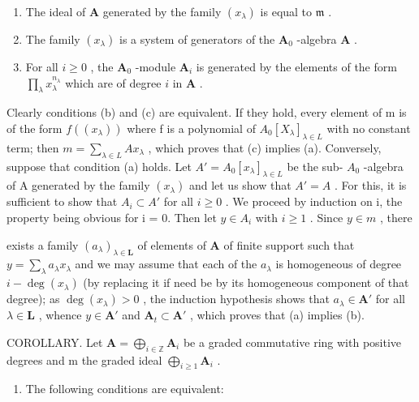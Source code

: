 \begin{enumerate}
\def\labelenumi{(\alph{enumi})}
\item
  The ideal of \(\mathbf{A}\) generated by the family \((x_{\lambda})\) is equal to \(\mathfrak{m}\) .
\item
  The family \((x_{\lambda})\) is a system of generators of the \(\mathbf{A}_0\) -algebra \(\mathbf{A}\) .
\item
  For all \(i \geqslant 0\) , the \(\mathbf{A}_0\) -module \(\mathbf{A}_i\) is generated by the elements of the form \(\prod_{\lambda} x_{\lambda}^{n_{\lambda}}\) which are of degree \(i\) in \(\mathbf{A}\) .
\end{enumerate}

Clearly conditions (b) and (c) are equivalent. If they hold, every element of m is of the form \(f((x_{\lambda}))\) where f is a polynomial of \(A_{0}[X_{\lambda}]_{\lambda \in L}\) with no constant term; then \(m = \sum_{\lambda \in L} Ax_{\lambda}\) , which proves that (c) implies (a). Conversely, suppose that condition (a) holds. Let \(A' = A_{0}[x_{\lambda}]_{\lambda \in L}\) be the sub- \(A_{0}\) -algebra of A generated by the family \((x_{\lambda})\) and let us show that \(A' = A\) . For this, it is sufficient to show that \(A_{i} \subset A'\) for all \(i \geqslant 0\) . We proceed by induction on i, the property being obvious for i = 0. Then let \(y \in A_{i}\) with \(i \geqslant 1\) . Since \(y \in m\) , there

exists a family \((a_{\lambda})_{\lambda \in \mathbf{L}}\) of elements of \(\mathbf{A}\) of finite support such that \(y = \sum_{\lambda} a_{\lambda} x_{\lambda}\) and we may assume that each of the \(a_{\lambda}\) is homogeneous of degree \(i - \deg(x_{\lambda})\) (by replacing it if need be by its homogeneous component of that degree); as \(\deg(x_{\lambda}) > 0\) , the induction hypothesis shows that \(a_{\lambda} \in \mathbf{A}'\) for all \(\lambda \in \mathbf{L}\) , whence \(y \in \mathbf{A}'\) and \(\mathbf{A}_t \subset \mathbf{A}'\) , which proves that (a) implies (b).

COROLLARY. Let \(\mathbf{A} = \bigoplus_{i\in \mathbb{Z}}\mathbf{A}_i\) be a graded commutative ring with positive degrees and m the graded ideal \(\bigoplus_{i\geqslant 1}\mathbf{A}_i\) .

\begin{enumerate}
\def\labelenumi{(\roman{enumi})}
\tightlist
\item
  The following conditions are equivalent:
\end{enumerate}

